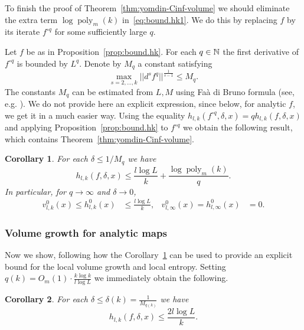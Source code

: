 \documentclass[reqno]{amsart}
\newtheorem{Cor}{Corollary}{\bfseries}{\itshape}
\renewcommand\~[1]{\widetilde{#1}}
\def\poly{\operatorname{poly}} \def\J{\operatorname{J}}
\begin{document}
To finish the proof of Theorem~\ref{thm:yomdin-Cinf-volume} we should
eliminate the extra term $\log\poly_m(k)$
in~\eqref{eq:bound.hk1}. We do this by replacing $f$ by its iterate
$f^{\circ q}$ for some sufficiently large $q$.

Let $f$ be as in Proposition~\ref{prop:bound.hk}. For each $q\in{\mathbb N}$
the first derivative of $f^{\circ q}$ is bounded by $L^q$. Denote by
$M_q$ a constant satisfying
\begin{equation}
  \max_{s=2,\ldots,k}||d^sf^q||^{\frac{1}{s-1}}\le M_q.
\end{equation}
The constants $M_q$ can be estimated from $L,M$ using Fa\`a di Bruno
formula (see, e.g. \cite{bly}). We do not provide here an explicit
expression, since below, for analytic $f$, we get it in a much easier
way. Using the equality
$h_{l,k}(f^{\circ q},\delta,x)=qh_{l,k}(f,\delta,x)$ and applying
Proposition~\ref{prop:bound.hk} to $f^{\circ q}$ we obtain the
following result, which contains Theorem~\ref{thm:yomdin-Cinf-volume}.

\begin{Cor}\label{cor:bound.hk1}
  For each $\delta\le1/M_q$ we have
  \begin{equation}\label{eq:bound.hk2}
    h_{l,k}(f,\delta,x)\le \frac{l\log L}{k} + \frac{\log\poly_m(k)}{q}.    
  \end{equation}
  In particular, for $q\to\infty$ and $\delta\to0$,
  \begin{align}\label{eq:lim.delta}
    v^0_{l,k}(x)\le h^0_{l,k}(x)&\le \frac{l\log L}{k}, & v^0_{l,\infty}(x)=h^0_{l,\infty}(x)&=0.
  \end{align}
\end{Cor}

\subsubsection{Volume growth for analytic maps}

Now we show, following \cite{bly} how the
Corollary~\ref{cor:bound.hk1} can be used to provide an explicit bound
for the local volume growth and local entropy. Setting
$q(k)=O_m(1)\cdot \frac{k \log k}{l\log L}$ we immediately obtain the
following.

\begin{Cor}\label{cor:bound.hk2}
  For each $\delta \leq \delta(k)= \frac{1}{M_{q(k)}}$ we have
  \begin{equation}\label{eq:bound.hk3}
    h_{l,k}(f,\delta,x)\le \frac{2l\log L}{k}.
  \end{equation}
\end{Cor}
\end{document}
